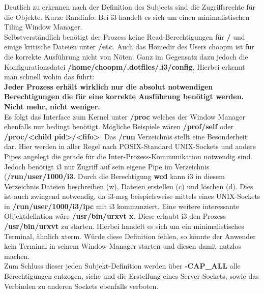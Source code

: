 Deutlich zu erkennen nach der Definition des Subjects sind die Zugriffsrechte für die Objekte. Kurze Randinfo: Bei i3 handelt es sich um einen minimalistischen Tiling Window Manager.\\
Selbstverständlich benötigt der Prozess keine Read-Berechtigungen für \textbf{/} und einige kritische Dateien unter \textbf{/etc}. Auch das Homedir des Users choopm ist für die korrekte Ausführung nicht von Nöten. Ganz im Gegensatz dazu jedoch die Konfigurationsdatei \textbf{/home/choopm/.dotfiles/.i3/config}. Hierbei erkennt man schnell wohin das führt:\\
\textbf{Jeder Prozess erhält wirklich nur die absolut notwendigen Berechtigungen die für eine korrekte Ausführung benötigt werden. Nicht mehr, nicht weniger.}\\
Es folgt das Interface zum Kernel unter \textbf{/proc} welches der Window Manager ebenfalls nur bedingt benötigt. Mögliche Beispiele wären \textbf{/prof/self} oder \textbf{/proc/\textless child pid\textgreater /\textless fifo\textgreater}.
Das \textbf{/run} Verzeichnis stellt eine Besonderheit dar. Hier werden in aller Regel nach POSIX-Standard UNIX-Sockets und andere Pipes angelegt die gerade für die Inter-Prozess-Kommunikation notwendig sind. Jedoch benötigt i3 nur Zugriff auf sein eigene Pipe im Verzeichnis (\textbf{/run/user/1000/i3}. Durch die Berechtigung \textbf{wcd} kann i3 in diesem Verzeichnis Dateien beschreiben (w), Dateien erstellen (c) und löschen (d). Dies ist auch zwingend notwendig, da i3-msg beispielsweise mittels eines UNIX-Sockets in \textbf{/run/user/1000/i3/ipc} mit i3 kommunziert.
Eine weitere interessante Objektdefintion wäre \textbf{/usr/bin/urxvt          x}. Diese erlaubt i3 den Prozess \textbf{/usr/bin/urxvt} zu starten. Hierbei handelt es sich um ein minimalistisches Terminal, ähnlich xterm. Würde diese Definition fehlen, so könnte der Anwender kein Terminal in seinem Window Manager starten und diesen damit nutzlos machen.\\
Zum Schluss dieser jeden Subjekt-Definition werden über \textbf{-CAP\_ALL} alle Berechtigungen entzogen, siehe  und die Erstellung eines Server-Sockets, sowie das Verbinden zu anderen Sockets ebenfalls verboten.

